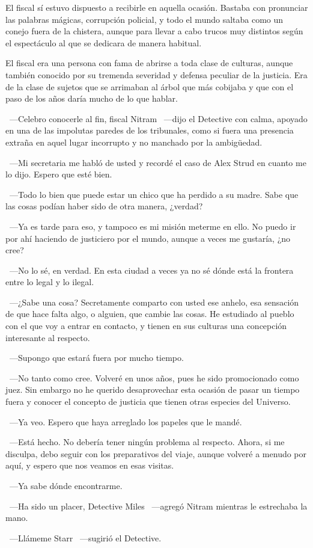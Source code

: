 El fiscal sí estuvo dispuesto a recibirle en aquella ocasión. Bastaba con pronunciar las palabras mágicas, corrupción policial, y todo el mundo saltaba como un conejo fuera de la chistera, aunque para llevar a cabo trucos muy distintos según el espectáculo al que se dedicara de manera habitual.

El fiscal era una persona con fama de abrirse a toda clase de culturas, aunque también conocido por su tremenda severidad y defensa peculiar de la justicia. Era de la clase de sujetos que se arrimaban al árbol que más cobijaba y que con el paso de los años daría mucho de lo que hablar.

~---Celebro conocerle al fin, fiscal Nitram ~---dijo el Detective con calma, apoyado en una de las impolutas paredes de los tribunales, como si fuera una presencia extraña en aquel lugar incorrupto y no manchado por la ambigüedad.

~---Mi secretaria me habló de usted y recordé el caso de Alex Strud en cuanto me lo dijo. Espero que esté bien.

~---Todo lo bien que puede estar un chico que ha perdido a su madre. Sabe que las cosas podían haber sido de otra manera, ¿verdad?

~---Ya es tarde para eso, y tampoco es mi misión meterme en ello. No puedo ir por ahí haciendo de justiciero por el mundo, aunque a veces me gustaría, ¿no cree?

~---No lo sé, en verdad. En esta ciudad a veces ya no sé dónde está la frontera entre lo legal y lo ilegal.

~---¿Sabe una cosa? Secretamente comparto con usted ese anhelo, esa sensación de que hace falta algo, o alguien, que cambie las cosas. He estudiado al pueblo con el que voy a entrar en contacto, y tienen en sus culturas una concepción interesante al respecto.

~---Supongo que estará fuera por mucho tiempo.

~---No tanto como cree. Volveré en unos años, pues he sido promocionado como juez. Sin embargo no he querido desaprovechar esta ocasión de pasar un tiempo fuera y conocer el concepto de justicia que tienen otras especies del Universo.

~---Ya veo. Espero que haya arreglado los papeles que le mandé.

~---Está hecho. No debería tener ningún problema al respecto. Ahora, si me disculpa, debo seguir con los preparativos del viaje, aunque volveré a menudo por aquí, y espero que nos veamos en esas visitas.

~---Ya sabe dónde encontrarme.

~---Ha sido un placer, Detective Miles ~---agregó Nitram mientras le estrechaba la mano.

~---Llámeme Starr ~---sugirió el Detective.

\endinput
